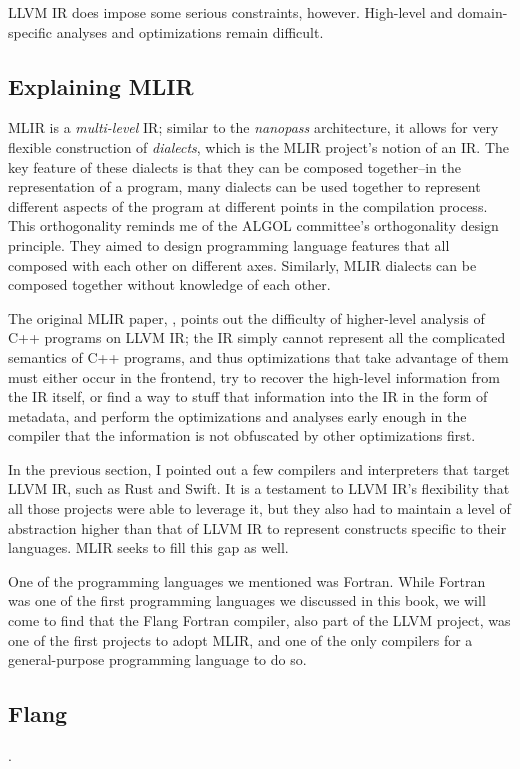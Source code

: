 LLVM IR does impose some serious constraints, however.
High-level and domain-specific analyses and optimizations remain difficult.

\subsection{Explaining MLIR}

MLIR\cite{lattner_amini_mlir_og_paper_2021} is a \textit{multi-level} IR;
similar to the \textit{nanopass} architecture\cite{keep_dybvig_nanopass_2013},
it allows for very flexible construction of \textit{dialects}, which is the MLIR
project's notion of an IR. The key feature of these dialects is that they can be
composed together--in the representation of a program, many dialects can be used
together to represent different aspects of the program at different points in
the compilation process.
This orthogonality reminds me of the ALGOL committee's orthogonality design principle.
They aimed to design programming language features that all composed with each other
on different axes.
Similarly, MLIR dialects can be composed together without knowledge of each other.

The original MLIR paper, ,
points out the difficulty of higher-level analysis of C++ programs on LLVM IR;
the IR simply cannot represent all the complicated semantics of C++ programs,
and thus optimizations that take advantage of them must either occur in the
frontend, try to recover the high-level information from the IR itself,
or find a way to stuff that information into the IR in the form of metadata,
and perform the optimizations and analyses early enough in the compiler that
the information is not obfuscated by other optimizations first.

In the previous section, I pointed out a few compilers and interpreters that
target LLVM IR, such as Rust and Swift.
It is a testament to LLVM IR's flexibility that all those projects were able to
leverage it, but they also had to maintain a level of abstraction higher than that
of LLVM IR to represent constructs specific to their languages.
MLIR seeks to fill this gap as well.

One of the programming languages we mentioned was Fortran.
While Fortran was one of the first programming languages we discussed in this book,
we will come to find that the Flang Fortran compiler, also part of the LLVM project,
was one of the first projects to adopt MLIR, and one of the only compilers for a
general-purpose programming language to do so.

\subsection{Flang}

.

